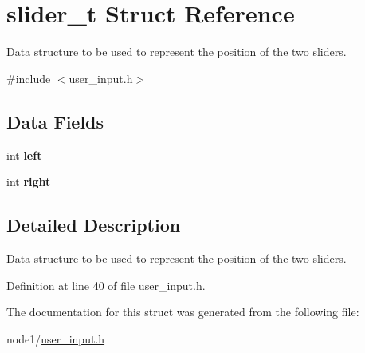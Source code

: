 \hypertarget{structslider__t}{}\section{slider\+\_\+t Struct Reference}
\label{structslider__t}


Data structure to be used to represent the position of the two sliders.  




{\ttfamily \#include $<$user\+\_\+input.\+h$>$}

\subsection*{Data Fields}
\begin{DoxyCompactItemize}
\item 
\mbox{\label{structslider__t_ad5040feae647217823d453600c823327}} 
int {\bfseries left}
\item 
\mbox{\label{structslider__t_a14a76535a14bb893cfd07f5e828a16c9}} 
int {\bfseries right}
\end{DoxyCompactItemize}


\subsection{Detailed Description}
Data structure to be used to represent the position of the two sliders. 

Definition at line 40 of file user\+\_\+input.\+h.



The documentation for this struct was generated from the following file\+:\begin{DoxyCompactItemize}
\item 
node1/\hyperlink{node1_2user__input_8h}{user\+\_\+input.\+h}\end{DoxyCompactItemize}

